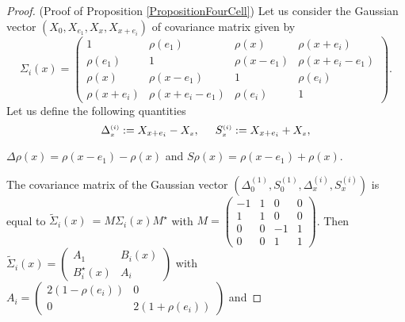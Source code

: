 \documentclass[12pt]{article}
\renewcommand{\tilde}{\widetilde}
\theoremstyle{Theorem}
\begin{document}
\begin{proof}(Proof of Proposition \ref{PropositionFourCell})
Let us consider the Gaussian vector $\left(X_{\scriptscriptstyle 0}, X_{e_1}, X_{\scriptscriptstyle x}, X_{x+e_i}\right)$ of covariance matrix given by $$\Sigma_{i}(x) = \begin{pmatrix} 1 & \rho(e_1) & \rho(x) & \rho(x+e_i)\\
\rho(e_1) & 1 & \rho(x-e_1) &  \rho(x+e_i- e_1) \\ 
\rho(x) & \rho(x-e_1) & 1 & \rho(e_i) \\
\rho(x+e_i) & \rho(x+e_i-e_1) & \rho(e_i) & 1 \end{pmatrix}.$$ 
Let us define the following quantities   \begin{equation} \label{expressions} \Delta^{\scriptscriptstyle (i)}_{\scriptscriptstyle x} := X_{x+e_i} - X_{\scriptscriptstyle x}, \hspace{0.5cm} S^{\scriptscriptstyle (i)}_{\scriptscriptstyle x} := X_{x+e_i} + X_{\scriptscriptstyle x},\end{equation}
\begin{center}
$\Delta \rho(x) = \rho(x-e_1)-\rho(x)$ and $S\rho(x)  =  \rho(x-e_1)+\rho(x)$.
\end{center}
The covariance matrix of the Gaussian vector $\left(\Delta^{\scriptscriptstyle (1)}_{\scriptscriptstyle 0}, S^{\scriptscriptstyle (1)}_{\scriptscriptstyle 0}, \Delta^{\scriptscriptstyle (i)}_{\scriptscriptstyle x}, S^{\scriptscriptstyle (i)}_{\scriptscriptstyle x}\right)$ is equal to ${\tilde{\Sigma}_{i}(x)~= M\Sigma_{i}(x) M^{\star}}$ with {\small $M = \begin{pmatrix}
-1 & 1 & 0 &  0 \\
1 & 1 & 0 &  0 \\
0& 0 & -1 &  1 \\
0 & 0 & 1 & 1
\end{pmatrix}$}. Then $\tilde{\Sigma}_{i}(x) = \begin{pmatrix} A_{1} & B_{i}(x) \\ B^{\star}_{i}(x) & A_{i} \end{pmatrix}$
with 
$A_{i} = \begin{pmatrix} 2(1-\rho(e_i)) & 0 \\ 0 & 2(1+\rho(e_i))\end{pmatrix}$ and 
\end{proof}
\end{document}
